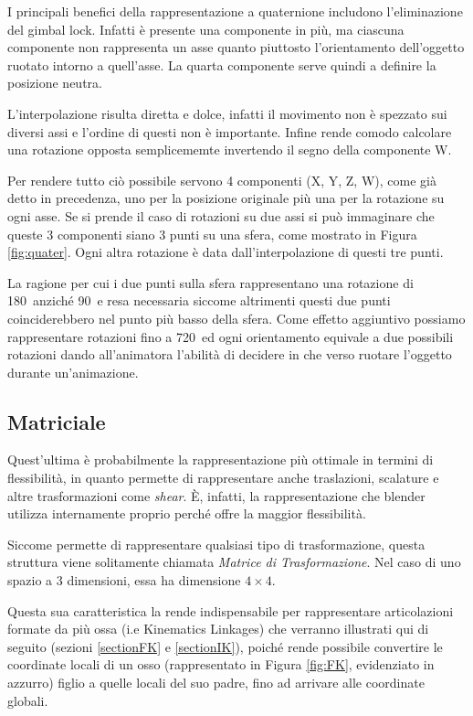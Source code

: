 I principali benefici della rappresentazione a quaternione includono l'eliminazione del gimbal lock. Infatti è presente una componente in più, ma ciascuna componente non rappresenta un asse quanto piuttosto l'orientamento dell'oggetto ruotato intorno a quell'asse. La quarta componente serve quindi a definire la posizione neutra.

L'interpolazione risulta diretta e dolce, infatti il movimento non è spezzato sui diversi assi e l'ordine di questi non è importante. Infine rende comodo calcolare una rotazione opposta semplicememte invertendo il segno della componente W.

Per rendere tutto ciò possibile servono 4 componenti (X, Y, Z, W), come già detto in precedenza, uno per la posizione originale più una per la rotazione su ogni asse. Se si prende il caso di rotazioni su due assi si può immaginare che queste 3 componenti siano 3 punti su una sfera, come mostrato in Figura \ref{fig:quater}. Ogni altra rotazione è data dall'interpolazione di questi tre punti.

La ragione per cui i due punti sulla sfera rappresentano una rotazione di 180\textdegree\ anziché 90\textdegree\ e resa necessaria siccome altrimenti questi due punti coinciderebbero nel punto più basso della sfera. Come effetto aggiuntivo possiamo rappresentare rotazioni fino a 720\textdegree\ ed ogni orientamento equivale a due possibili rotazioni dando all'animatora l'abilità di decidere in che verso ruotare l'oggetto durante un'animazione. 

\subsection{Matriciale}
Quest'ultima è probabilmente la rappresentazione più ottimale in termini di flessibilità, in quanto permette di rappresentare anche traslazioni, scalature e altre trasformazioni come \emph{shear}. È, infatti, la rappresentazione che blender utilizza internamente \cite{blendApi} \cite{nat2012rig} proprio perché offre la maggior flessibilità.

Siccome permette di rappresentare qualsiasi tipo di trasformazione, questa struttura viene solitamente chiamata \emph{Matrice di Trasformazione}. Nel caso di uno spazio a 3 dimensioni, essa ha dimensione $4\times4$.

Questa sua caratteristica la rende indispensabile per rappresentare articolazioni formate da più ossa (i.e Kinematics Linkages) che verranno illustrati qui di seguito (sezioni \ref{sectionFK} e \ref{sectionIK}), poiché rende possibile convertire le coordinate locali di un osso (rappresentato in Figura \ref{fig:FK}, evidenziato in azzurro) figlio a quelle locali del suo padre, fino ad arrivare alle coordinate globali.

